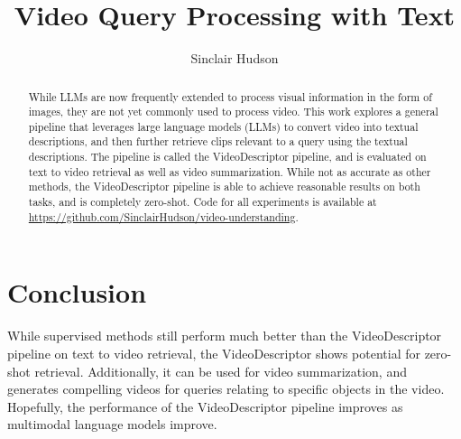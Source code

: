 \documentclass{article}
\title{Video Query Processing with Text}
\author{Sinclair Hudson}
\begin{document}
\maketitle

\begin{abstract}
      While LLMs are now frequently extended to process visual information in the form of images, they are not yet commonly used to process video.
      This work explores a general pipeline that leverages large language models (LLMs) to convert video into textual descriptions, and then further retrieve clips relevant to a query using the textual descriptions.
      The pipeline is called the VideoDescriptor pipeline, and is evaluated on text to video retrieval as well as video summarization.
      While not as accurate as other methods, the VideoDescriptor pipeline is able to achieve reasonable results on both tasks, and is completely zero-shot.
      Code for all experiments is available at \url{https://github.com/SinclairHudson/video-understanding}.
\end{abstract}













\section{Conclusion}

While supervised methods still perform much better than the VideoDescriptor pipeline on text to video retrieval, the VideoDescriptor shows potential for zero-shot retrieval.
Additionally, it can be used for video summarization, and generates compelling videos for queries relating to specific objects in the video.
Hopefully, the performance of the VideoDescriptor pipeline improves as multimodal language models improve.



\end{document}
